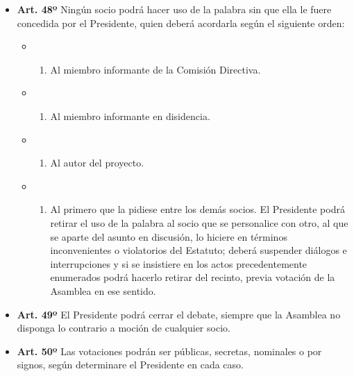 \documentclass[openany]{book}
\providecommand{\tightlist}{%
  \setlength{\itemsep}{0pt}\setlength{\parskip}{0pt}}
\begin{document}
\begin{itemize}
\tightlist
\item
  \textbf{Art. 48º}
  Ningún socio podrá hacer uso de la palabra sin que ella le fuere concedida por el Presidente, quien deberá acordarla según el siguiente orden:

  \begin{itemize}
  \item
    \begin{enumerate}
    \def\labelenumi{\alph{enumi})}
    \tightlist
    \item
      Al miembro informante de la Comisión Directiva.
    \end{enumerate}
  \item
    \begin{enumerate}
    \def\labelenumi{\alph{enumi})}
    \setcounter{enumi}{1}
    \tightlist
    \item
      Al miembro informante en disidencia.
    \end{enumerate}
  \item
    \begin{enumerate}
    \def\labelenumi{\alph{enumi})}
    \setcounter{enumi}{2}
    \tightlist
    \item
      Al autor del proyecto.
    \end{enumerate}
  \item
    \begin{enumerate}
    \def\labelenumi{\alph{enumi})}
    \setcounter{enumi}{3}
    \tightlist
    \item
      Al primero que la pidiese entre los demás socios. El Presidente podrá retirar el uso de la palabra al socio que se personalice con otro, al que se aparte del asunto en discusión, lo hiciere en términos inconvenientes o violatorios del Estatuto; deberá suspender diálogos e interrupciones y si se insistiere en los actos precedentemente enumerados podrá hacerlo retirar del recinto, previa votación de la Asamblea en ese sentido.
    \end{enumerate}
  \end{itemize}
\end{itemize}

\begin{itemize}
\tightlist
\item
  \textbf{Art. 49º}
  El Presidente podrá cerrar el debate, siempre que la Asamblea no disponga lo contrario a moción de cualquier socio.
\end{itemize}

\begin{itemize}
\tightlist
\item
  \textbf{Art. 50º}
  Las votaciones podrán ser públicas, secretas, nominales o por signos, según determinare el Presidente en cada caso.
\end{itemize}
\end{document}
